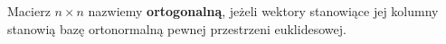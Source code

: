 \begin{definition}
	Macierz \(n \times n\) nazwiemy \textbf{ortogonalną}, jeżeli wektory stanowiące jej kolumny stanowią bazę ortonormalną pewnej przestrzeni euklidesowej.
\end{definition}


